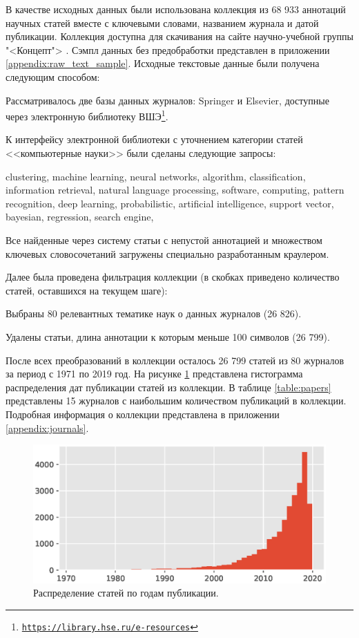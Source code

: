 \documentclass[12pt]{article}
\newenvironment{enumerate*}%
{\begin{enumerate}%
	\setlength{\itemsep}{0pt}%
	\setlength{\parskip}{0pt}}%
{\end{enumerate}}
\newcommand{\hrefl}[1] {\texttt{\href{#1}{#1}}}
\begin{document}
В качестве исходных данных были использована коллекция из 68 933 аннотаций научных статей вместе с ключевыми словами, названием журнала и датой публикации. Коллекция доступна для скачивания на сайте научно-учебной группы "<Концепт"> \cite{concept_datasets}. Сэмпл данных без предобработки представлен в приложении \ref{appendix:raw_text_sample}.
Исходные текстовые данные были получена следующим способом:
\begin{enumerate*}
	\item Рассматривалось две базы данных журналов: Springer и Elsevier, доступные через электронную библиотеку ВШЭ\footnote{\hrefl{https://library.hse.ru/e-resources}}.
	\item К интерфейсу электронной библиотеки с уточнением категории статей <<компьютерные науки>> были сделаны следующие запросы:
	
	\textsf{clustering, machine learning, neural networks, algorithm, classification, information retrieval, natural language processing, software, computing, pattern recognition, deep learning, probabilistic, artificial intelligence, support vector, bayesian, regression, search engine}, 
	
	\item Все найденные через систему статьи с непустой аннотацией и множеством ключевых словосочетаний загружены специально разработанным краулером.
\end{enumerate*}
Далее была проведена фильтрация коллекции (в скобках приведено количество статей, оставшихся на текущем шаге):
\begin{enumerate*}
	\item Выбраны 80 релевантных тематике наук о данных журналов (26 826).
	\item Удалены статьи, длина аннотации к которым меньше 100 символов (26 799).
\end{enumerate*}
После всех преобразований в коллекции осталось 26 799 статей из 80 журналов за период с 1971 по 2019 год. На рисунке \ref{fig:papersdatehist} представлена гистограмма распределения дат публикации статей из коллекции. В таблице \ref{table:papers} представлены 15 журналов с наибольшим количеством публикаций в коллекции. Подробная информация о коллекции представлена в приложении \ref{appendix:journals}. 

\begin{figure}
	\centering
	\includegraphics[width=0.8\linewidth]{images/papers_date_hist}
	\caption{Распределение статей по годам публикации.}
	\label{fig:papersdatehist}
\end{figure}
\end{document}
